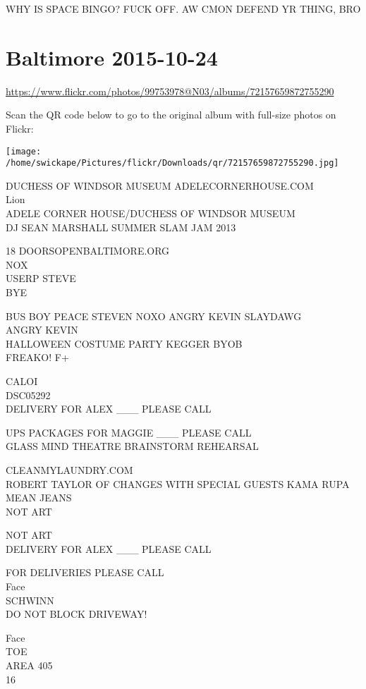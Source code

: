 \documentclass[10pt,letterpaper]{article}
\begin{document}
WHY IS SPACE BINGO?  FUCK OFF.  AW CMON DEFEND YR THING, BRO


\section*{Baltimore 2015-10-24}

\url{https://www.flickr.com/photos/99753978@N03/albums/72157659872755290}

Scan the QR code below to go to the original album with full-size photos on Flickr:

\texttt{[image: /home/swickape/Pictures/flickr/Downloads/qr/72157659872755290.jpg]}


DUCHESS OF WINDSOR MUSEUM ADELECORNERHOUSE.COM\\
Lion\\
ADELE CORNER HOUSE/DUCHESS OF WINDSOR MUSEUM\\
DJ SEAN MARSHALL SUMMER SLAM JAM 2013

18 DOORSOPENBALTIMORE.ORG\\
NOX\\
USERP STEVE\\
BYE

BUS BOY PEACE STEVEN NOXO ANGRY KEVIN SLAYDAWG\\
ANGRY KEVIN\\
HALLOWEEN COSTUME PARTY KEGGER BYOB\\
FREAKO!  F+

CALOI\\
DSC05292\\
DELIVERY FOR ALEX \_\_\_ PLEASE CALL

UPS PACKAGES FOR MAGGIE \_\_\_ PLEASE CALL\\
GLASS MIND THEATRE BRAINSTORM REHEARSAL

CLEANMYLAUNDRY.COM\\
ROBERT TAYLOR OF CHANGES WITH SPECIAL GUESTS KAMA RUPA\\
MEAN JEANS\\
NOT ART

NOT ART\\
DELIVERY FOR ALEX \_\_\_ PLEASE CALL

FOR DELIVERIES PLEASE CALL\\
Face\\
SCHWINN\\
DO NOT BLOCK DRIVEWAY!

Face\\
TOE\\
AREA 405\\
16
\end{document}
